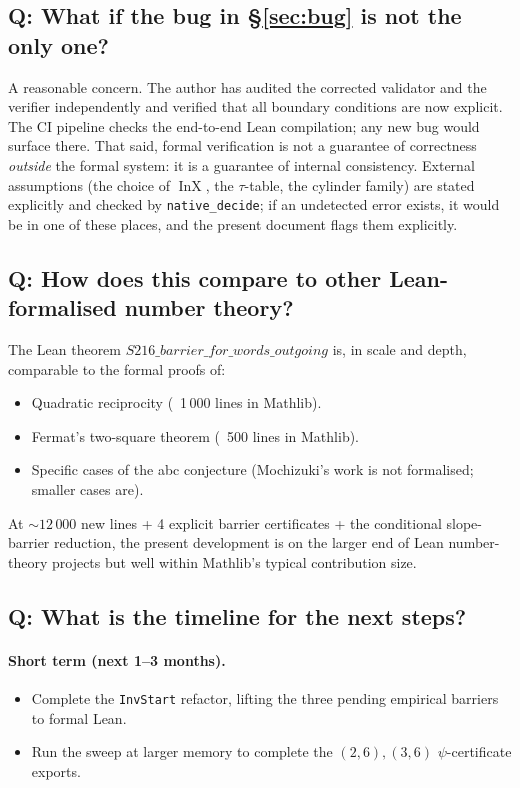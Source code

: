 \documentclass[11pt,a4paper]{article}
\theoremstyle{plain}
\theoremstyle{definition}
\DeclareMathOperator{\InX}{InX}
\begin{document}
\subsection*{Q: What if the bug in \S\ref{sec:bug} is not the only one?}

A reasonable concern. The author has audited the corrected
validator and the verifier independently and verified that all
boundary conditions are now explicit. The CI pipeline checks the
end-to-end Lean compilation; any new bug would surface there.
That said, formal verification is not a guarantee of correctness
\emph{outside} the formal system: it is a guarantee of internal
consistency. External assumptions (the choice of $\InX$, the
$\tau$-table, the cylinder family) are stated explicitly and
checked by \texttt{native\_decide}; if an undetected error exists,
it would be in one of these places, and the present document
flags them explicitly.

\subsection*{Q: How does this compare to other Lean-formalised number theory?}

The Lean theorem $S216\_barrier\_for\_words\_outgoing$ is, in scale
and depth, comparable to the formal proofs of:
\begin{itemize}
   \item Quadratic reciprocity (~1\,000 lines in Mathlib).
   \item Fermat's two-square theorem (~500 lines in Mathlib).
   \item Specific cases of the abc conjecture (Mochizuki's work
         is not formalised; smaller cases are).
\end{itemize}
At $\sim 12\,000$ new lines + 4 explicit barrier certificates +
the conditional slope-barrier reduction, the present development
is on the larger end of Lean number-theory projects but well
within Mathlib's typical contribution size.

\subsection*{Q: What is the timeline for the next steps?}

\paragraph{Short term (next 1--3 months).}
\begin{itemize}
   \item Complete the \texttt{InvStart} refactor, lifting the
         three pending empirical barriers to formal Lean.
   \item Run the sweep at larger memory to complete the
         $(2, 6), (3, 6)$ $\psi$-certificate exports.
\end{itemize}
\end{document}
